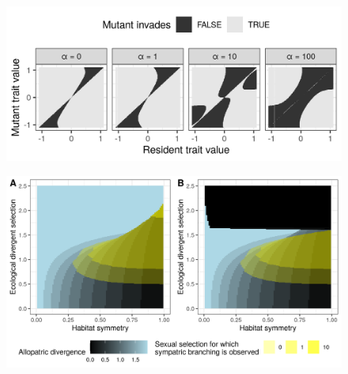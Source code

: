 \begin{figure}
    \centering
    \includegraphics[width=\textwidth]{figures/pairwise_invasibility_plots_test_alpha}
    \caption{}
    \label{fig:pairwise_invasibility_alpha}
\end{figure}

\begin{figure}
    \centering
    \includegraphics[width=\textwidth]{figures/divergence_across_patches}
     \label{fig:map_divergence}
\end{figure}